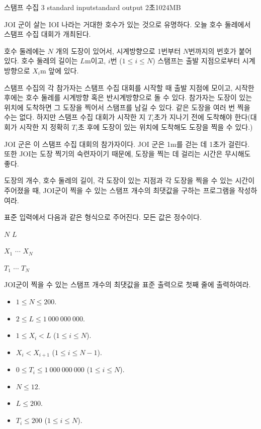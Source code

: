 \begin{problem}{스탬프 수집 3}
	{standard input}{standard output}
	{2초}{1024MB}{}
	
	JOI 군이 살는 IOI 나라는 거대한 호수가 있는 것으로 유명하다. 오늘 호수 둘레에서 스탬프 수집 대회가 개최된다.
	
	호수 둘레에는 $N$ 개의 도장이 있어서, 시계방향으로 1번부터 $N$번까지의 번호가 붙어있다. 호수 둘레의 길이는 $L$m이고, $i$번 ($1 \le i \le N$) 스탬프는 출발 지점으로부터 시계방향으로 $X_i$m 앞에 있다.
	
	스탬프 수집의 각 참가자는 스탬프 수집 대회를 시작할 때 출발 지점에 모이고, 시작한 후에는 호수 둘레를 시계방향 혹은 반시계방향으로 돌 수 있다. 참가자는 도장이 있는 위치에 도착하면 그 도장을 찍어서 스탬프를 남길 수 있다. 같은 도장을 여러 번 찍을 수는 없다. 하지만 스탬프 수집 대회가 시작한 지 $T_i$초가 지나기 전에 도착해야 한다(대회가 시작한 지 정확히 $T_i$초 후에 도장이 있는 위치에 도착해도 도장을 찍을 수 있다.)
	
	JOI 군은 이 스탬프 수집 대회의 참가자이다. JOI 군은 1m를 걷는 데 1초가 걸린다. 또한 JOI는 도장 찍기의 숙련자이기 때문에, 도장을 찍는 데 걸리는 시간은 무시해도 좋다. 
	
	도장의 개수, 호수 둘레의 길이, 각 도장이 있는 지점과 각 도장을 찍을 수 있는 시간이 주어졌을 때, JOI군이 찍을 수 있는 스탬프 개수의 최댓값을 구하는 프로그램을 작성하여라.
	
	
	\InputFile
	
	표준 입력에서 다음과 같은 형식으로 주어진다. 모든 값은 정수이다.

	$N$ $L$
	
	$X_1$ $\cdots$ $X_N$
	
	$T_1$ $\cdots$ $T_N$
	
	\OutputFile
	
	JOI군이 찍을 수 있는 스탬프 개수의 최댓값을 표준 출력으로 첫째 줄에 출력하여라.
	
	
	\Constraints
	
	\begin{itemize}
	\item $1 \le N \le 200$.
	\item $2 \le L \le 1\ 000\ 000\ 000$.
	\item $1 \le X_i < L$ ($1 \le i \le N$).
	\item $X_i < X_{i+1}$ ($1 \le i \le N-1$).
	\item $0 \le T_i \le 1\ 000\ 000\ 000$ ($1 \le i \le N$).
	\end{itemize}
	
	
	\begin{itemize}
		\item $N \le 12$.
		\item $L \le 200$.
		\item $T_i \le 200$ ($1 \le i \le N$).
	\end{itemize}


\end{problem}
